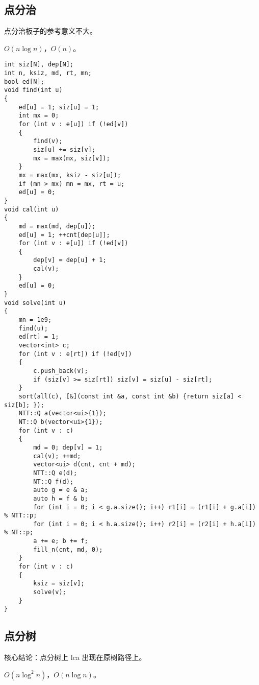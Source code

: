 \documentclass[12pt]{ctexart}
\begin{document}
\subsection{点分治}

点分治板子的参考意义不大。

$O(n\log n)$，$O(n)$。

\begin{lstlisting}
int siz[N], dep[N];
int n, ksiz, md, rt, mn;
bool ed[N];
void find(int u)
{
	ed[u] = 1; siz[u] = 1;
	int mx = 0;
	for (int v : e[u]) if (!ed[v])
	{
		find(v);
		siz[u] += siz[v];
		mx = max(mx, siz[v]);
	}
	mx = max(mx, ksiz - siz[u]);
	if (mn > mx) mn = mx, rt = u;
	ed[u] = 0;
}
void cal(int u)
{
	md = max(md, dep[u]);
	ed[u] = 1; ++cnt[dep[u]];
	for (int v : e[u]) if (!ed[v])
	{
		dep[v] = dep[u] + 1;
		cal(v);
	}
	ed[u] = 0;
}
void solve(int u)
{
	mn = 1e9;
	find(u);
	ed[rt] = 1;
	vector<int> c;
	for (int v : e[rt]) if (!ed[v])
	{
		c.push_back(v);
		if (siz[v] >= siz[rt]) siz[v] = siz[u] - siz[rt];
	}
	sort(all(c), [&](const int &a, const int &b) {return siz[a] < siz[b]; });
	NTT::Q a(vector<ui>{1});
	NT::Q b(vector<ui>{1});
	for (int v : c)
	{
		md = 0; dep[v] = 1;
		cal(v); ++md;
		vector<ui> d(cnt, cnt + md);
		NTT::Q e(d);
		NT::Q f(d);
		auto g = e & a;
		auto h = f & b;
		for (int i = 0; i < g.a.size(); i++) r1[i] = (r1[i] + g.a[i]) % NTT::p;
		for (int i = 0; i < h.a.size(); i++) r2[i] = (r2[i] + h.a[i]) % NT::p;
		a += e; b += f;
		fill_n(cnt, md, 0);
	}
	for (int v : c)
	{
		ksiz = siz[v];
		solve(v);
	}
}
\end{lstlisting}

\subsection{点分树}

核心结论：点分树上 lca 出现在原树路径上。

$O(n\log^2 n)$，$O(n\log n)$。
\end{document}
